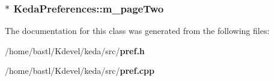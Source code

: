 \subsubsection{$\ast$ {\bf Keda\-Preferences::m\_\-page\-Two}\hspace{0.3cm}{\tt  [private]}}\label{classKedaPreferences_e415a6a2699c0a2f7a450bc0d877b64c}




The documentation for this class was generated from the following files:\begin{CompactItemize}
\item 
/home/bastl/Kdevel/keda/src/{\bf pref.h}\item 
/home/bastl/Kdevel/keda/src/{\bf pref.cpp}\end{CompactItemize}
